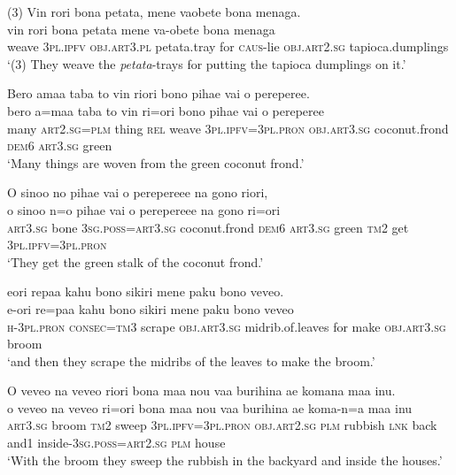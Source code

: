 \ea\label{ex:text01-107}
(3) Vin rori bona petata, mene vaobete bona menaga.\\
\gll vin	rori	bona	petata	mene	va-obete	bona	menaga\\
     weave	3\textsc{pl}.\textsc{ipfv}	\textsc{obj}.\textsc{art}3.\textsc{pl}	petata.tray	for	\textsc{caus}-lie	\textsc{obj}.\textsc{art}2.\textsc{sg}	tapioca.dumplings\\
\glt `(3) They weave the \textit{petata}-trays for putting the tapioca dumplings on it.'
\z

\ea\label{ex:text01-108}
Bero amaa taba to vin riori bono pihae vai o pereperee.\\
\gll bero	a=maa	taba	to	vin	ri=ori	bono	pihae	vai	o	pereperee\\
     many	\textsc{art}2.\textsc{sg}=\textsc{plm}	thing	\textsc{rel}	weave	3\textsc{pl}.\textsc{ipfv}=3\textsc{pl}.\textsc{pron}	\textsc{obj}.\textsc{art}3.\textsc{sg}	coconut.frond	\textsc{dem}6	\textsc{art}3.\textsc{sg}	green\\
\glt `Many things are woven from the green coconut frond.'
\z

\ea\label{ex:text01-109}
O sinoo no pihae vai o perepereee na gono riori,\\
\gll o	sinoo	n=o	pihae	vai	o	perepereee	na	gono	ri=ori\\
     \textsc{art}3.\textsc{sg}	bone	3\textsc{sg}.\textsc{poss}=\textsc{art}3.\textsc{sg}	coconut.frond	\textsc{dem}6	\textsc{art}3.\textsc{sg}	green	\textsc{tm}2	get	3\textsc{pl}.\textsc{ipfv}=3\textsc{pl}.\textsc{pron}\\
\glt `They get the green stalk of the coconut frond.'
\z

\ea\label{ex:text01-110}
eori repaa kahu bono sikiri mene paku bono veveo.\\
\gll e-ori	re=paa	kahu	bono	sikiri	mene	paku	bono	veveo\\
     \textsc{h}-3\textsc{pl}.\textsc{pron}	\textsc{consec}=\textsc{tm}3	scrape	\textsc{obj}.\textsc{art}3.\textsc{sg}	midrib.of.leaves	for	make	\textsc{obj}.\textsc{art}3.\textsc{sg}	broom\\
\glt `and then they scrape the midribs of the leaves to make the broom.'
\z

\ea\label{ex:text01-111}
O veveo na veveo riori bona maa nou vaa burihina ae komana maa inu.\\
\gll o	veveo	na	veveo	ri=ori	bona	maa	nou	vaa	burihina	ae	koma-n=a	maa	inu\\
     \textsc{art}3.\textsc{sg}	broom	\textsc{tm}2	sweep	3\textsc{pl}.\textsc{ipfv}=3\textsc{pl}.\textsc{pron}	\textsc{obj}.\textsc{art}2.\textsc{sg}	\textsc{plm}	rubbish	\textsc{lnk}	back	and1	inside-3\textsc{sg}.\textsc{poss}=\textsc{art}2.\textsc{sg}	\textsc{plm}	house\\
\glt `With the broom they sweep the rubbish in the backyard and inside the houses.'
\z

